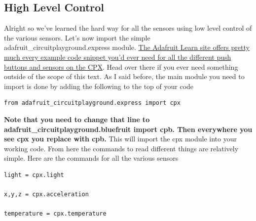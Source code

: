{\subsection{High Level Control}

Alright so we’ve learned the hard way for all the sensors using low level control of the various sensors. Let’s now import the simple adafruit\_circuitplayground.express module. \href{https://learn.adafruit.com/circuitpython-made-easy-on-circuit-playground-express/circuit-playground-express-library}{The Adafruit Learn site offers pretty much every example code snippet you’d ever need for all the different push buttons and sensors on the CPX}. Head over there if you ever need something outside of the scope of this text. As I said before, the main module you need to import is done by adding the following to the top of your code
\begin{verbatim}
from adafruit_circuitplayground.express import cpx
\end{verbatim}
{\bf Note that you need to change that line to adafruit\_circuitplayground.bluefruit import cpb. Then everywhere you see cpx you replace with cpb.}
This will import the cpx module into your working code. From here the commands to read different things are relatively simple. Here are the commands for all the various sensors
\begin{verbatim}
light = cpx.light

x,y,z = cpx.acceleration

temperature = cpx.temperature
\end{verbatim}

}

